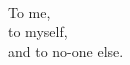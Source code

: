 % 

\thispagestyle{empty}

\ 

\vspace*{2cm}

{
\flushright\itshape

To me,\\
to myself,\\
and to no-one else.\\

}


\vfill




\endinput 